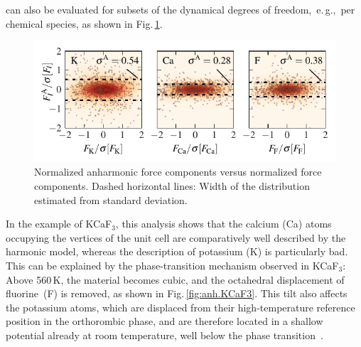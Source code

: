  can also be evaluated for subsets of the dynamical degrees of freedom,~e.\,g.,~per chemical species, as shown in Fig.\,\ref{fig.anh.sigmaA.atoms}.
\begin{figure}
	\includegraphics[width=\textwidth]{./data/plots/anharmonicity/5_density_plots/histogram_atoms.pdf}
	\caption{
		Normalized anharmonic force components versus normalized force components. Dashed horizontal lines: Width of the distribution estimated from standard deviation.
	}
	\label{fig.anh.sigmaA.atoms}
\end{figure}
In the example of KCaF$_3$, this analysis shows that the calcium (Ca) atoms occupying the vertices of the unit cell are comparatively well described by the harmonic model, whereas the description of potassium (K) is particularly bad. This can be explained by the phase-transition mechanism observed in KCaF$_3$: Above 560\,K, the material becomes cubic, and the octahedral displacement of fluorine~(F) is removed, as shown in Fig.\,\ref{fig:anh.KCaF3}. This tilt also affects the potassium atoms, which are displaced from their high-temperature reference position in the orthorombic phase, and are therefore located in a shallow potential already at room temperature, well below the phase transition~\cite{Bulou.1980,Hidaka.1984}.

